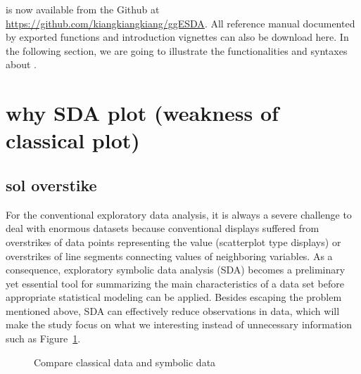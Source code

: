 \documentclass[article]{jss}
\begin{document}
 is now available from the Github at \url{https://github.com/kiangkiangkiang/ggESDA}. All reference manual documented by exported functions and introduction vignettes can also be download here. In the following section, we are going to illustrate the functionalities and syntaxes about .


\section{why SDA plot (weakness of classical plot)}

\subsection{sol overstike}
For the conventional exploratory data analysis, it is always a severe challenge to deal with enormous datasets because conventional displays suffered from overstrikes of data points representing the value (scatterplot type displays) or overstrikes of line segments connecting values of neighboring variables. As a consequence, exploratory symbolic data analysis (SDA) becomes a preliminary yet essential tool for summarizing the main characteristics of a data set before appropriate statistical modeling can be applied. Besides escaping the problem mentioned above, SDA can effectively reduce observations in data, which will make the study focus on what we interesting instead of unnecessary information such as Figure~\ref{fig:compare}.

\begin{figure}[htbp]
\caption{\label{fig:compare} Compare classical data and symbolic data}
\end{figure}
\end{document}
